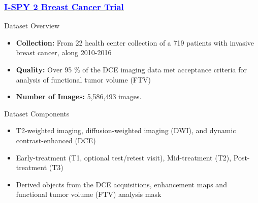 \documentclass{beamer}
\begin{document}
    \begin{frame}
        \frametitle{ \href{https://nbia.cancerimagingarchive.net/viewer/?study=1.3.6.1.4.1.14519.5.2.1.7695.4164.273481108061907436142425976120&series=1.3.6.1.4.1.14519.5.2.1.7695.4164.327894017749939121381164595822&token=c2744136-6276-4bb6-8111-2e85dcbda6cf}{\underline{\textcolor{blue}{I-SPY 2 Breast Cancer Trial}}}}

        \begin{block}{Dataset Overview}
            \begin{itemize}
                \item \textbf{Collection:} From 22 health center collection of a 719 patients with invasive breast cancer, along 2010-2016
                \item \textbf{Quality:} Over 95 \% of the DCE imaging data met acceptance criteria for analysis of functional tumor volume (FTV)
                \item \textbf{Number of Images:} 5,586,493 images.
            \end{itemize}
        \end{block}
        \begin{block}{Dataset Components}
            \begin{itemize}
                \item T2-weighted imaging, diffusion-weighted imaging (DWI), and dynamic contrast-enhanced (DCE)
                \item Early-treatment (T1, optional test/retest visit), Mid-treatment (T2), Post-treatment (T3)
                \item Derived objects from the DCE acquisitions, enhancement maps and functional tumor volume (FTV) analysis mask
            \end{itemize}
        \end{block}
    \end{frame}
\end{document}
